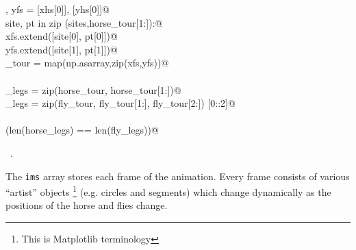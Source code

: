 \documentclass[11.5pt]{report}
\begin{document}
\begin{flushleft}
\begin{list}{}{}
\mbox{}\verb@xfs , yfs = [xhs[0]], [yhs[0]]@\\
\mbox{}\verb@for site, pt in zip (sites,horse_tour[1:]):@\\
\mbox{}\verb@         xfs.extend([site[0], pt[0]])@\\
\mbox{}\verb@         yfs.extend([site[1], pt[1]])@\\
\mbox{}\verb@fly_tour = map(np.asarray,zip(xfs,yfs))@\\
\mbox{}\verb@@\\
\mbox{}\verb@horse_legs = zip(horse_tour, horse_tour[1:])@\\
\mbox{}\verb@fly_legs   = zip(fly_tour, fly_tour[1:], fly_tour[2:]) [0::2]@\\
\mbox{}\verb@@\\
\mbox{}\verb@assert(len(horse_legs) == len(fly_legs))@\\
\mbox{}\verb@@{\NWsep}
\end{list}
\vspace{-1.5ex}
\footnotesize
\begin{list}{}{\setlength{\itemsep}{-\parsep}\setlength{\itemindent}{-\leftmargin}}
\item \NWtxtMacroRefIn\ .

\item{}
\end{list}
\vspace{4ex}
\end{flushleft}
\vspace{-0.8cm} \newchunk The \verb|ims| array stores each frame of the animation. Every frame consists of 
various ``artist'' objects \footnote{This is Matplotlib terminology} (e.g. circles and segments) which change dynamically as the positions of the horse 
and flies change. 
\end{document}
